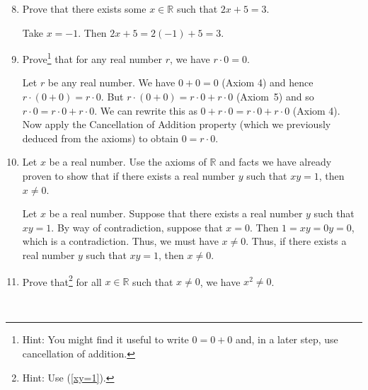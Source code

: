 \documentclass[12pt]{amsart}
\newcommand{\R}{{\mathbb{R}}}
\numberwithin{equation}{section}
\theoremstyle{plain} %
\theoremstyle{definition}
\theoremstyle{remark}
\begin{document}
\begin{enumerate}\setcounter{enumi}{7}

\item Prove that there exists some $x\in \R$ such that $2x+5=3$.

\begin{framed}Take $x=-1$. Then $2x+5=2(-1)+5=3$. \end{framed}

\item Prove\footnote{Hint: You might find it useful to write $0=0+0$ and, in a later step, use cancellation of addition.} that for any real number $r$, we have $r \cdot 0 = 0$.

\begin{framed} Let $r$ be any real number. We have $0 +  0 = 0$ (Axiom 4) and hence $r \cdot (0 + 0) = r \cdot 0$. But
$r \cdot (0 + 0) = r \cdot 0 + r \cdot 0$ (Axiom~5) and so $r \cdot 0 = r \cdot 0 + r \cdot 0$. We can rewrite this as
$0 + r \cdot 0 = r \cdot 0 + r \cdot 0$ (Axiom 4). Now apply the Cancellation of Addition property (which we previously deduced from the axioms) to obtain
$0 = r \cdot 0$.\end{framed}



\item\label{xy=1} Let $x$ be a real number. Use the axioms of $\R$ and facts we have already proven to show that if there exists a real number $y$ such that $xy=1$, then $x\neq 0$.

\begin{framed} 
Let $x$ be a real number. Suppose that there exists a real number $y$ such that $xy=1$. By way of contradiction, suppose that $x=0$. Then $1=xy=0y=0$, which is a contradiction. Thus, we must have $x\neq 0$. Thus, if there exists a real number $y$ such that $xy=1$, then $x\neq 0$.
\end{framed}

\item Prove that\footnote{Hint: Use (\ref{xy=1}).} for all $x\in \R$ such that $x\neq 0$, we have $x^2\neq 0$.

\






\end{enumerate}





\newpage
\end{document}

